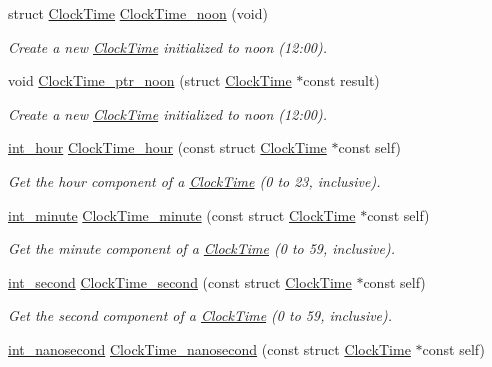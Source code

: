 \begin{DoxyCompactItemize}
struct \hyperlink{structClockTime}{Clock\-Time} \hyperlink{clock-time_8h_a7f66f1fc5941b55ba08e40a2e2777106}{Clock\-Time\-\_\-noon} (void)
\begin{DoxyCompactList}\small\item\em Create a new \hyperlink{structClockTime}{Clock\-Time} initialized to noon (12\-:00). \end{DoxyCompactList}\item 
void \hyperlink{clock-time_8h_a0d675e833b96d51d7ba743f09f6a0ee8}{Clock\-Time\-\_\-ptr\-\_\-noon} (struct \hyperlink{structClockTime}{Clock\-Time} $\ast$const result)
\begin{DoxyCompactList}\small\item\em Create a new \hyperlink{structClockTime}{Clock\-Time} initialized to noon (12\-:00). \end{DoxyCompactList}\item 
\hyperlink{types_8h_abc83767329d565949a30f9990b5b2323}{int\-\_\-hour} \hyperlink{clock-time_8h_a197ecd5df7f193d534e51794051ea68c}{Clock\-Time\-\_\-hour} (const struct \hyperlink{structClockTime}{Clock\-Time} $\ast$const self)
\begin{DoxyCompactList}\small\item\em Get the hour component of a \hyperlink{structClockTime}{Clock\-Time} (0 to 23, inclusive). \end{DoxyCompactList}\item 
\hyperlink{types_8h_ac1c9417e7360815b48bbc1efa2b8240c}{int\-\_\-minute} \hyperlink{clock-time_8h_a71ebda6c0d3f39c5ee3287170b081e62}{Clock\-Time\-\_\-minute} (const struct \hyperlink{structClockTime}{Clock\-Time} $\ast$const self)
\begin{DoxyCompactList}\small\item\em Get the minute component of a \hyperlink{structClockTime}{Clock\-Time} (0 to 59, inclusive). \end{DoxyCompactList}\item 
\hyperlink{types_8h_a48e89dcdfecb9766dce0baf6254d089e}{int\-\_\-second} \hyperlink{clock-time_8h_abd89cc75c460c6b9b906c2b433e0f29c}{Clock\-Time\-\_\-second} (const struct \hyperlink{structClockTime}{Clock\-Time} $\ast$const self)
\begin{DoxyCompactList}\small\item\em Get the second component of a \hyperlink{structClockTime}{Clock\-Time} (0 to 59, inclusive). \end{DoxyCompactList}\item 
\hyperlink{types_8h_a6bb2edd220168240795ae6d50d7bf140}{int\-\_\-nanosecond} \hyperlink{clock-time_8h_a68bdc6e05da575968f51c2fcff6bcb8e}{Clock\-Time\-\_\-nanosecond} (const struct \hyperlink{structClockTime}{Clock\-Time} $\ast$const self)

\end{DoxyCompactItemize}
